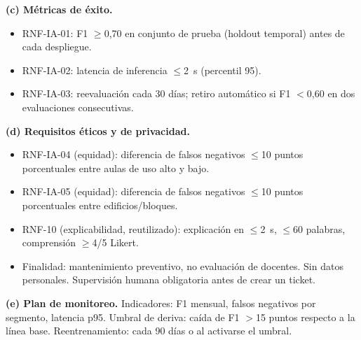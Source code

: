 \textbf{(c) M\'etricas de \'exito.}
\begin{itemize}[nosep]
\item RNF-IA-01: F1 $\geq$0,70 en conjunto de prueba (holdout temporal) antes de cada despliegue.
\item RNF-IA-02: latencia de inferencia $\leq$2~s (percentil 95).
\item RNF-IA-03: reevaluaci\'on cada 30 d\'ias; retiro autom\'atico si F1 $<$0,60 en dos evaluaciones consecutivas.
\end{itemize}

\textbf{(d) Requisitos \'eticos y de privacidad.}
\begin{itemize}[nosep]
\item RNF-IA-04 (equidad): diferencia de falsos negativos $\leq$10 puntos porcentuales entre aulas de uso alto y bajo.
\item RNF-IA-05 (equidad): diferencia de falsos negativos $\leq$10 puntos porcentuales entre edificios/bloques.
\item RNF-10 (explicabilidad, reutilizado): explicaci\'on en $\leq$2~s, $\leq$60 palabras, comprensi\'on $\geq$4/5 Likert.
\item Finalidad: mantenimiento preventivo, no evaluaci\'on de docentes. Sin datos personales. Supervisi\'on humana obligatoria antes de crear un ticket.
\end{itemize}

\textbf{(e) Plan de monitoreo.} Indicadores: F1 mensual, falsos negativos por segmento, latencia p95. Umbral de deriva: ca\'ida de F1 $>$15 puntos respecto a la l\'inea base. Reentrenamiento: cada 90 d\'ias o al activarse el umbral.
